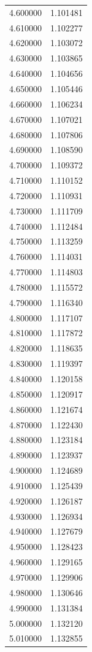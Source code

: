 \begin{tabular}{rr}
4.600000 & 1.101481 \\
4.610000 & 1.102277 \\
4.620000 & 1.103072 \\
4.630000 & 1.103865 \\
4.640000 & 1.104656 \\
4.650000 & 1.105446 \\
4.660000 & 1.106234 \\
4.670000 & 1.107021 \\
4.680000 & 1.107806 \\
4.690000 & 1.108590 \\
4.700000 & 1.109372 \\
4.710000 & 1.110152 \\
4.720000 & 1.110931 \\
4.730000 & 1.111709 \\
4.740000 & 1.112484 \\
4.750000 & 1.113259 \\
4.760000 & 1.114031 \\
4.770000 & 1.114803 \\
4.780000 & 1.115572 \\
4.790000 & 1.116340 \\
4.800000 & 1.117107 \\
4.810000 & 1.117872 \\
4.820000 & 1.118635 \\
4.830000 & 1.119397 \\
4.840000 & 1.120158 \\
4.850000 & 1.120917 \\
4.860000 & 1.121674 \\
4.870000 & 1.122430 \\
4.880000 & 1.123184 \\
4.890000 & 1.123937 \\
4.900000 & 1.124689 \\
4.910000 & 1.125439 \\
4.920000 & 1.126187 \\
4.930000 & 1.126934 \\
4.940000 & 1.127679 \\
4.950000 & 1.128423 \\
4.960000 & 1.129165 \\
4.970000 & 1.129906 \\
4.980000 & 1.130646 \\
4.990000 & 1.131384 \\
5.000000 & 1.132120 \\
5.010000 & 1.132855 \\

\end{tabular}
